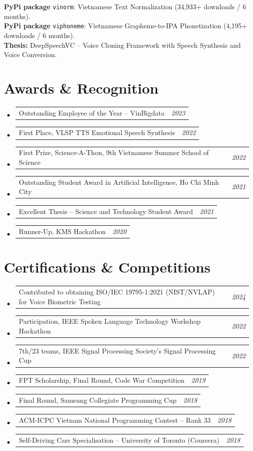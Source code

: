 \documentclass[10pt,a4paper]{article}
\makeatletter
\newcommand{\cvline}[2]{%
  \noindent
  \begin{tabular*}{\linewidth}{@{}l@{\extracolsep{\fill}}r@{}}
    #1 & \textit{\small #2}
  \end{tabular*}%
}
\makeatother
\begin{document}
\vspace{2pt}
\noindent\textbf{PyPi package} \texttt{vinorm}: Vietnamese Text Normalization (34,933+ downloads / 6 months).\\
\noindent\textbf{PyPi package} \texttt{viphoneme}: Vietnamese Grapheme-to-IPA Phonetization (4,195+ downloads / 6 months).\\[2pt]
\noindent\textbf{Thesis:} DeepSpeechVC -- Voice Cloning Framework with Speech Synthesis and Voice Conversion.

\section{Awards \& Recognition}

\begin{itemize}
  \item \cvline{Outstanding Employee of the Year -- VinBigdata}{2023}
  \item \cvline{First Place, VLSP TTS Emotional Speech Synthesis}{2022}
  \item \cvline{First Prize, Science-A-Thon, 9th Vietnamese Summer School of Science}{2022}
  \item \cvline{Outstanding Student Award in Artificial Intelligence, Ho Chi Minh City}{2021}
  \item \cvline{Excellent Thesis -- Science and Technology Student Award}{2021}
  \item \cvline{Runner-Up, KMS Hackathon}{2020}
\end{itemize}

\section{Certifications \& Competitions}

\begin{itemize}
  \item \cvline{Contributed to obtaining ISO/IEC 19795-1:2021 (NIST/NVLAP) for Voice Biometric Testing}{2024}
  \item \cvline{Participation, IEEE Spoken Language Technology Workshop Hackathon}{2022}
  \item \cvline{7th/23 teams, IEEE Signal Processing Society's Signal Processing Cup}{2022}
  \item \cvline{FPT Scholarship, Final Round, Code War Competition}{2019}
  \item \cvline{Final Round, Samsung Collegiate Programming Cup}{2018}
  \item \cvline{ACM-ICPC Vietnam National Programming Contest -- Rank 33}{2018}
  \item \cvline{Self-Driving Cars Specialisation -- University of Toronto (Coursera)}{2018}
\end{itemize}
\end{document}
